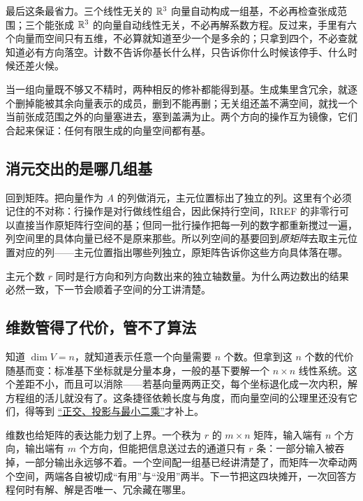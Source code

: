 最后这条最省力。三个线性无关的 \(\mathbb{R}^3\) 向量自动构成一组基，不必再检查张成范围；三个能张成 \(\mathbb{R}^3\) 的向量自动线性无关，不必再解系数方程。反过来，手里有六个向量而空间只有五维，不必算就知道至少一个是多余的；只拿到四个，不必查就知道必有方向落空。计数不告诉你基长什么样，只告诉你什么时候该停手、什么时候还差火候。

当一组向量既不够又不精时，两种相反的修补都能得到基。生成集里含冗余，就逐个删掉能被其余向量表示的成员，删到不能再删；无关组还盖不满空间，就找一个当前张成范围之外的向量塞进去，塞到盖满为止。两个方向的操作互为镜像，它们合起来保证：任何有限生成的向量空间都有基。

\subsection{消元交出的是哪几组基}

回到矩阵。把向量作为 \(A\) 的列做消元，主元位置标出了独立的列。这里有个必须记住的不对称：行操作是对行做线性组合，因此保持行空间，RREF 的非零行可以直接当作原矩阵行空间的基；但同一批行操作把每一列的数字都重新搅过一遍，列空间里的具体向量已经不是原来那些。所以列空间的基要回到\emph{原矩阵}去取主元位置对应的列——主元位置指出哪些列独立，原矩阵告诉你这些方向具体落在哪。

主元个数 \(r\) 同时是行方向和列方向数出来的独立轴数量。为什么两边数出的结果必然一致，下一节会顺着子空间的分工讲清楚。

\subsection{维数管得了代价，管不了算法}

知道 \(\dim V=n\)，就知道表示任意一个向量需要 \(n\) 个数。但拿到这 \(n\) 个数的代价随基而变：标准基下坐标就是分量本身，一般的基下要解一个 \(n\times n\) 线性系统。这个差距不小，而且可以消除——若基向量两两正交，每个坐标退化成一次内积，解方程组的活儿就没有了。这条捷径依赖长度与角度，而向量空间的公理里还没有它们，得等到 \hyperref[ch:018]{``正交、投影与最小二乘''}才补上。

维数也给矩阵的表达能力划了上界。一个秩为 \(r\) 的 \(m\times n\) 矩阵，输入端有 \(n\) 个方向，输出端有 \(m\) 个方向，但能把信息送过去的通道只有 \(r\) 条：一部分输入被吞掉，一部分输出永远够不着。一个空间配一组基已经讲清楚了，而矩阵一次牵动两个空间，两端各自被切成``有用''与``没用''两半。下一节把这四块摊开，一次回答方程何时有解、解是否唯一、冗余藏在哪里。

